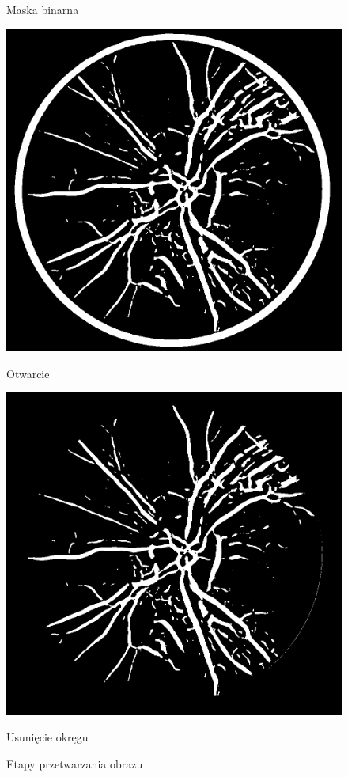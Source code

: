 \documentclass[polish,polish,a4paper]{article}
\begin{document}
\begin{figure}[!h]
\begin{minipage}{0.3\linewidth}
				\caption*{Maska binarna}
			\end{minipage}
			\begin{minipage}{0.3\linewidth}
				\includegraphics[width=\linewidth]{./dane/metoda1/opening.png}
				\caption*{Otwarcie}
			\end{minipage}
			\begin{minipage}{0.3\linewidth}
				\includegraphics[width=\linewidth]{./dane/metoda1/ring.png}
				\caption*{Usunięcie okręgu}
			\end{minipage}
			\caption*{Etapy przetwarzania obrazu}
		\end{figure}
		
\end{document}
